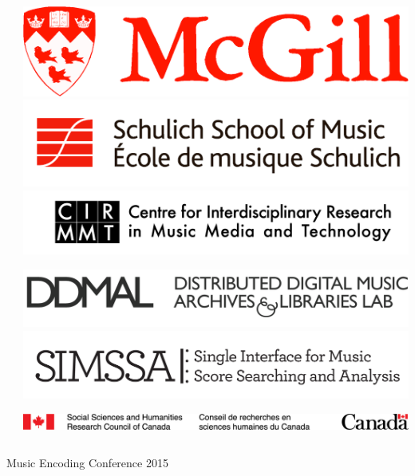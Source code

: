 \documentclass[final]{beamer}
\newlength{\onecolwid}
\begin{document}
\begin{frame}[fragile,t]
\begin{columns}
\begin{column}{\onecolwid}
\end{column}
\begin{column}{\onecolwid}
\begin{block}{}
\vspace{-2cm}
\centering
\includegraphics[scale=0.2625]{images/McGill_logo}
\hspace{1.2cm} 
\includegraphics[scale=0.75]{images/Schulich_logo}
\hspace{1.2cm} 
\includegraphics[scale=0.2625]{images/CIRMMT_logo}

\centering
\includegraphics[scale=0.36]{images/ddmal_logo_large}
\includegraphics[scale=1]{images/SIMSSA_logo}

\includegraphics[width=\onecolwid]{images/SSHRC_logo}
\end{block}
\end{column}
\end{columns}

\vspace{1em}

Music Encoding Conference 2015
\end{frame}
\end{document}
